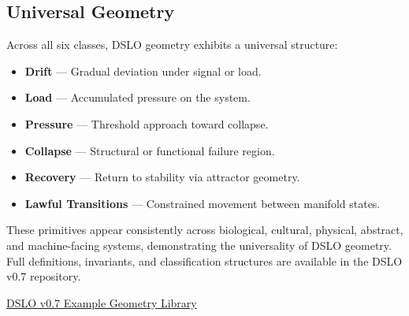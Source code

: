 \subsection{Universal Geometry}
Across all six classes, DSLO geometry exhibits a universal structure:

\begin{itemize}
    \item \textbf{Drift} --- Gradual deviation under signal or load.
    \item \textbf{Load} --- Accumulated pressure on the system.
    \item \textbf{Pressure} --- Threshold approach toward collapse.
    \item \textbf{Collapse} --- Structural or functional failure region.
    \item \textbf{Recovery} --- Return to stability via attractor geometry.
    \item \textbf{Lawful Transitions} --- Constrained movement between manifold states.
\end{itemize}

These primitives appear consistently across biological, cultural, physical,
abstract, and machine-facing systems, demonstrating the universality of DSLO
geometry. Full definitions, invariants, and classification structures are
available in the DSLO v0.7 repository.

\medskip

\href{https://github.com/Signal-Ecology/DSLO-v0.7-Semantic-Substrate-Specification/tree/main/EXAMPLES}
     {DSLO v0.7 Example Geometry Library}






